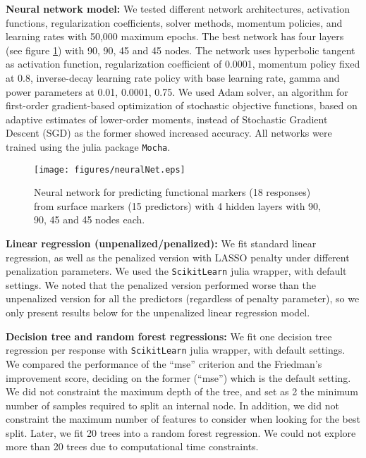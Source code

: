 \documentclass[graybox]{svmult}
\begin{document}
\vspace{0.25cm}
\noindent \textbf{Neural network model:} We tested different network
architectures, activation functions, regularization coefficients,
solver methods, momentum policies, and learning rates with 50,000 maximum epochs. The best
network has four layers (see figure \ref{nn}) with 90, 90, 45 and 45
nodes. The network uses hyperbolic tangent as activation function,
regularization coefficient of 0.0001, momentum policy fixed at 0.8, inverse-decay learning
rate policy with base learning rate, gamma and power parameters at 0.01, 0.0001, 0.75. We used Adam solver\cite{Kingma2014}, an
algorithm for first-order gradient-based optimization of stochastic
objective functions, based on adaptive estimates of lower-order
moments, instead of Stochastic Gradient Descent (SGD) as the former
showed increased accuracy. All networks were trained using the julia
package \texttt{Mocha}\cite{Bezanson2017,mocha}.

\begin{figure}
\centering
\texttt{[image: figures/neuralNet.eps]}
\caption{Neural network for predicting functional markers (18
  responses) from surface markers (15 predictors) with 4 hidden
  layers with 90, 90, 45 and 45 nodes each.}
\label{nn}
\end{figure}

\vspace{0.25cm}
\noindent \textbf{Linear regression (unpenalized/penalized):} We fit
standard linear regression, as well as the penalized version with
LASSO penalty under different penalization parameters. We used the
\texttt{ScikitLearn}\cite{scikit} julia wrapper, with default
settings. We noted that the penalized version performed worse than the
unpenalized version for all the predictors (regardless of penalty
parameter), so we only present results below for the unpenalized
linear regression model.

\vspace{0.25cm}
\noindent \textbf{Decision tree and random forest regressions:} We fit one decision tree
regression per response with \texttt{ScikitLearn} julia wrapper, with default
settings. We compared the performance of the ``mse'' criterion and the
Friedman's improvement score, deciding on the former (``mse'') which
is the default setting. We did not constraint the maximum depth of the
tree, and set as 2 the minimum number of samples required to split an
internal node. In addition, we did not constraint the maximum number
of features to consider when looking for the best split. Later, we fit
20 trees into a random forest regression. We could not explore more than 20
trees due to computational time constraints.
\end{document}
